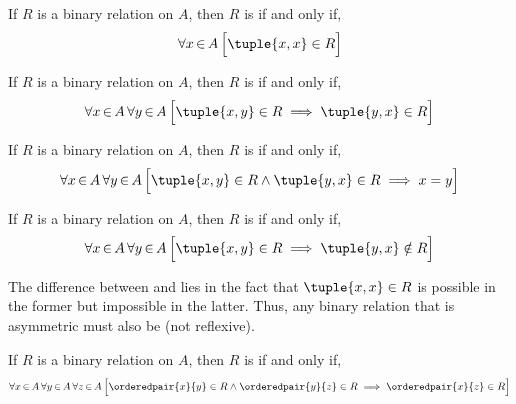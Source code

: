 \begin{dfn}[Reflexivity]
    \label{dfn:reflexivity-of-binary-relations}
    If \( R \) is a binary relation on \( A \), then \( R \) is 
    if and only if,
    \begin{equation*}
        \forall x\,{\in}\,A \, \Big[ \tuple{x,x} \in R \Big]
    \end{equation*}
\end{dfn}

\begin{dfn}[Symmetry]
    \label{dfn:symmetry-of-binary-relations}
    If \( R \) is a binary relation on \( A \), then \( R \) is 
    if and only if,
    \begin{equation*}
        \forall x\,{\in}\,A \, \forall y\,{\in}\,A \, \Big[ \tuple{x,y} \in R \implies \tuple{y,x} \in R \Big]
    \end{equation*}
\end{dfn}

\begin{dfn}
    \label{dfn:anti-symmetry-of-binary-relations}
    If \( R \) is a binary relation on \( A \), then \( R \) is  if and only if,
    \begin{equation*}
        \forall x\,{\in}\,A \, \forall y\,{\in}\,A \, \Big[ \tuple{x,y} \in R \land \tuple{y,x} \in R \implies x = y \Big]
    \end{equation*}
\end{dfn}

\begin{dfn}[Asymmetry]
    \label{dfn:asymmetry-of-binary-relations}
    If \( R \) is a binary relation on \( A \), then \( R \) is  if and only if,
    \begin{equation*}
        \forall x\,{\in}\,A \, \forall y\,{\in}\,A \, \Big[ \tuple{x,y} \in R \implies \tuple{y,x} \notin R \Big]
    \end{equation*}
\end{dfn}

\begin{rem}
    The difference between  and  lies in the fact that \( \tuple{x,x} \in R \)
    is possible in the former but impossible in the latter. Thus, any binary relation that is asymmetric must also be
     (not reflexive).
\end{rem}

\begin{dfn}[Transitivity]
    \label{dfn:transitivity-of-binary-relations}
    If \( R \) is a binary relation on \( A \), then \( R \) is  if and only if,
    \begin{equation*}
        \forall x\,{\in}\,A \, \forall y\,{\in}\,A \, \forall z\,{\in}\,A \,
        \Big[ \orderedpair{x}{y} \in R \land \orderedpair{y}{z} \in R \implies \orderedpair{x}{z} \in R \Big]
    \end{equation*}
\end{dfn}

